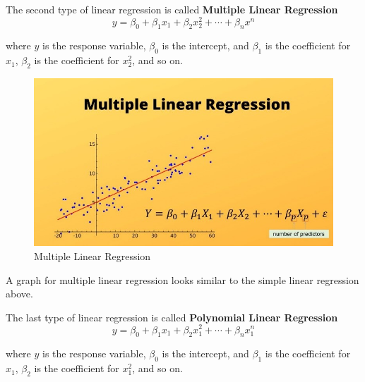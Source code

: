 The second type of linear regression is called \textbf{Multiple Linear Regression}
\begin{equation}
y = \beta_0 + \beta_1 x_1 + \beta_2 x_2^2 + \cdots + \beta_n x^n
\end{equation}
    
    where $y$ is the response variable, $\beta_0$ is the intercept, and $\beta_1$ is the coefficient for $x_1$, $\beta_2$ is the coefficient for $x_2^2$, and so on. \\


\begin{figure}[H]
    \includegraphics[width=\linewidth]{images/mlrgraph.jpg}
    \caption{Multiple Linear Regression}
    \label{fig:mlr}
\end{figure}


A graph for multiple linear regression looks similar to the simple linear regression above.

The last type of linear regression is called \textbf{Polynomial Linear Regression}
\begin{equation}
y = \beta_0 + \beta_1 x_1 + \beta_2 x_1^2 + \cdots + \beta_n x_1^n
\end{equation}
    
    where $y$ is the response variable, $\beta_0$ is the intercept, and $\beta_1$ is the coefficient for $x_1$, $\beta_2$ is the coefficient for $x_1^2$, and so on. \\
 
